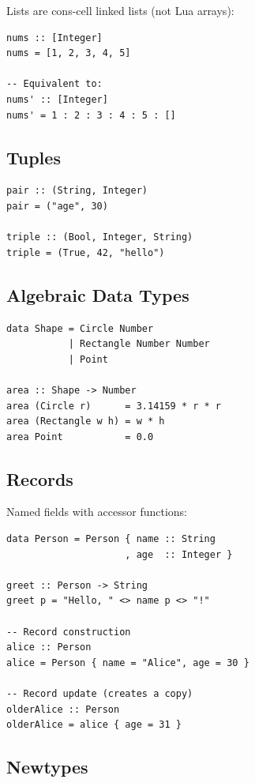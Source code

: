 \documentclass[11pt,a4paper]{article}
\begin{document}
Lists are cons-cell linked lists (not Lua arrays):

\begin{lstlisting}
nums :: [Integer]
nums = [1, 2, 3, 4, 5]

-- Equivalent to:
nums' :: [Integer]
nums' = 1 : 2 : 3 : 4 : 5 : []
\end{lstlisting}

\subsection{Tuples}

\begin{lstlisting}
pair :: (String, Integer)
pair = ("age", 30)

triple :: (Bool, Integer, String)
triple = (True, 42, "hello")
\end{lstlisting}

\subsection{Algebraic Data Types}

\begin{lstlisting}
data Shape = Circle Number
           | Rectangle Number Number
           | Point

area :: Shape -> Number
area (Circle r)      = 3.14159 * r * r
area (Rectangle w h) = w * h
area Point           = 0.0
\end{lstlisting}

\subsection{Records}

Named fields with accessor functions:

\begin{lstlisting}
data Person = Person { name :: String
                     , age  :: Integer }

greet :: Person -> String
greet p = "Hello, " <> name p <> "!"

-- Record construction
alice :: Person
alice = Person { name = "Alice", age = 30 }

-- Record update (creates a copy)
olderAlice :: Person
olderAlice = alice { age = 31 }
\end{lstlisting}

\subsection{Newtypes}
\end{document}
